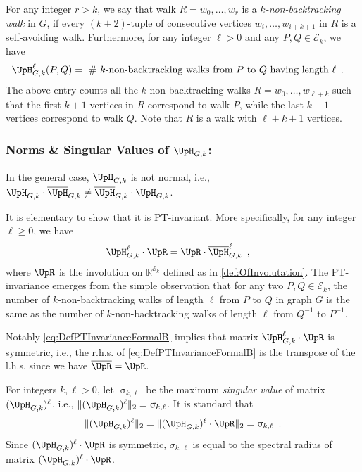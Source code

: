 \documentclass[11pt,reqno]{amsart}
\numberwithin{equation}{section}
\newcommand{\cE}{{\mathcal{E}}}
\newcommand{\applegreen}[1]{ {\color{applegreen}#1}}
\newcommand{\amethyst}[1]{{\color{amethyst}#1} }
\newcommand{\blue}[1]{{\color{blue}#1}}
\newcommand{\bluepigment}[1]{{\color{blue(pigment)}#1}}
\newcommand{\byzantine}[1]{{\color{byzantine}#1}}
\newcommand{\bostonuniversityred}[1]{{\color{bostonuniversityred}#1}}
\newcommand{\capri}[1]{{\color{capri}#1}}
\newcommand{\cadmiumgreen}[1]{{\color{cadmiumgreen}#1}}
\newcommand{\goldenbrown}[1]{{\color{goldenbrown}#1}}
\newcommand{\iris}[1]{{\color{iris}#1}}
\newcommand{\red}[1]{{\color{red}#1}}
\newcommand{\ExtV}{\iris{\cE}}
\newcommand{\norm}[2]{\goldenbrown{\|} #1 \goldenbrown{\|}_{#2}}
\newcommand{\MTR}[1]{\overline{#1}}
\newcommand{\NBMatrix}{\cadmiumgreen{\UpH}_{G,\kk}}
\newcommand{\NBMatrixE}{\byzantine{\UpH}}
\newcommand{\Invol}{\UpR}
\renewcommand{\applegreen}[1]{#1}
\renewcommand{\amethyst}[1]{#1}
\renewcommand{\blue}[1]{#1}
\renewcommand{\bluepigment}[1]{#1}
\renewcommand{\byzantine}[1]{#1}
\renewcommand{\bostonuniversityred}[1]{#1}
\renewcommand{\capri}[1]{#1}
\renewcommand{\cadmiumgreen}[1]{#1}
\renewcommand{\goldenbrown}[1]{#1}
\renewcommand{\iris}[1]{#1}
\renewcommand{\red}[1]{#1}
\newcommand{\ki}{\capri{i}}
\newcommand{\kk}{\bluepigment{k}}
\newcommand{\kell}{{\color{green(pigment)}\ell}}%
\newcommand{\kP}{\goldenbrown{P}}
\newcommand{\kQ}{\amethyst{Q}}
\newcommand{\kR}{\bostonuniversityred{R}}%
\newcommand{\kr}{\bostonuniversityred{r}}%
\newcommand{\kw}{\blue{w}}
\renewcommand{\ki}{i}
\renewcommand{\kk}{k}
\renewcommand{\kell}{\ell}
\renewcommand{\kP}{P}
\renewcommand{\kQ}{Q}
\renewcommand{\kR}{R}
\renewcommand{\kr}{r}
\renewcommand{\kw}{w}
\newcommand{\hsingular}{\upsigma}
\begin{document}
 
For any integer $\kr>\kk$, we say that walk $\kR=\kw_{0},\ldots, \kw_{\kr}$ is a {\em $\kk$-non-backtracking 
walk} in $G$, if every $(\kk+2)$-tuple of consecutive vertices $\kw_{\ki}, \ldots, \kw_{\ki+\kk+1}$ 
in $\kR$ is a self-avoiding walk.
%
Furthermore, for any integer $\kell>0$ and any $\kP,\kQ\in \ExtV_{\kk}$, we have 
\begin{align}
\NBMatrix^{\kell}(\kP,\kQ) &=\textrm{ $\#$ $\kk$-non-backtracking walks from $\kP$ to $\kQ$ having length $\kell$} \enspace.
\end{align}
The above entry counts all the $\kk$-non-backtracking walks $\kR=\kw_0, \ldots, \kw_{\kell+\kk}$ such that the first $\kk+1$ vertices
in $\kR$ correspond to  walk $\kP$, while the last $\kk+1$ vertices correspond to walk $\kQ$. 
Note that $\kR$ is a walk with $\kell+\kk+1$ vertices. 




\subsubsection*{Norms \& Singular Values of $\NBMatrix$:}
In the general case, $\NBMatrix$ is not normal, i.e., $\NBMatrix\cdot \MTR{\NBMatrixE}_{G,\kk} \neq \MTR{\NBMatrixE}_{G,\kk}\cdot {\NBMatrix}$.

It is elementary to show that it is PT-invariant. More specifically, for any integer $\kell\geq 0$, we have 
\begin{align}\label{eq:DefPTInvarianceFormalB}
\NBMatrix^{\kell} \cdot \Invol &= \Invol \cdot\MTR{\NBMatrixE}^{\kell}_{G,\kk}\enspace,
\end{align}
where $\Invol $ is the involution on $\mathbb{R}^{\ExtV_{\kk}}$ defined as in \eqref{def:OfInvolutation}. 
%
The PT-invariance emerges from the simple observation that for any two $\kP,\kQ \in \ExtV_{k}$, 
the number of $\kk$-non-backtracking walks of length $\kell$ from $\kP$ to $\kQ$ in graph $G$ is the
same as the number of $\kk$-non-backtracking walks of length $\kell$ from $\kQ^{-1}$ to $\kP^{-1}$. 


Notably \eqref{eq:DefPTInvarianceFormalB} implies that 
matrix $\NBMatrix^{\kell} \cdot \Invol$ is symmetric, i.e., the r.h.s. of \eqref{eq:DefPTInvarianceFormalB} is
the transpose of the l.h.s. since we have $\MTR{\Invol}={\Invol}$. 


 
 

For integers $\kk,\kell>0$, let $\hsingular_{\kk,\kell}$ be the maximum {\em singular value} of matrix 
$(\NBMatrix)^{\kell}$, i.e., $\norm{ (\NBMatrix)^{\kell}}{2}=\hsingular_{\kk,\kell}$. 
%
It is standard that 
\begin{align}
\norm{(\NBMatrix)^{\kell}}{2}=\norm{ (\NBMatrix)^{\kell} \cdot \Invol}{2}=\hsingular_{\kk,\kell}\enspace,
\end{align}
% 
%
Since $(\NBMatrix)^{\kell}\cdot \Invol$ is symmetric, 
 $\sigma_{\kk,\kell}$ is equal to the spectral radius of matrix $(\NBMatrix)^{\kell}\cdot \Invol$. 
\end{document}
